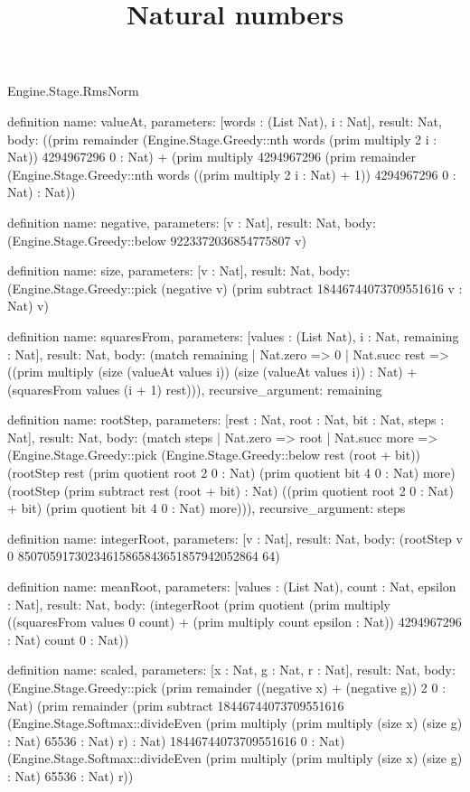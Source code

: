 \begin{lexlean}{Engine.Stage.RmsNorm}
\title{Natural numbers}
\begin{semanticmodule}
definition{
  name: valueAt,
  parameters: [words : (List Nat), i : Nat],
  result: Nat,
  body: ((prim remainder (Engine.Stage.Greedy::nth words (prim multiply 2 i : Nat)) 4294967296 0 : Nat) + (prim multiply 4294967296 (prim remainder (Engine.Stage.Greedy::nth words ((prim multiply 2 i : Nat) + 1)) 4294967296 0 : Nat) : Nat))
}

definition{
  name: negative,
  parameters: [v : Nat],
  result: Nat,
  body: (Engine.Stage.Greedy::below 9223372036854775807 v)
}

definition{
  name: size,
  parameters: [v : Nat],
  result: Nat,
  body: (Engine.Stage.Greedy::pick (negative v) (prim subtract 18446744073709551616 v : Nat) v)
}

definition{
  name: squaresFrom,
  parameters: [values : (List Nat), i : Nat, remaining : Nat],
  result: Nat,
  body: (match remaining
    | Nat.zero => 0
    | Nat.succ rest => ((prim multiply (size (valueAt values i)) (size (valueAt values i)) : Nat) + (squaresFrom values (i + 1) rest))),
  recursive_argument: remaining
}

definition{
  name: rootStep,
  parameters: [rest : Nat, root : Nat, bit : Nat, steps : Nat],
  result: Nat,
  body: (match steps
    | Nat.zero => root
    | Nat.succ more => (Engine.Stage.Greedy::pick (Engine.Stage.Greedy::below rest (root + bit)) (rootStep rest (prim quotient root 2 0 : Nat) (prim quotient bit 4 0 : Nat) more) (rootStep (prim subtract rest (root + bit) : Nat) ((prim quotient root 2 0 : Nat) + bit) (prim quotient bit 4 0 : Nat) more))),
  recursive_argument: steps
}

definition{
  name: integerRoot,
  parameters: [v : Nat],
  result: Nat,
  body: (rootStep v 0 85070591730234615865843651857942052864 64)
}

definition{
  name: meanRoot,
  parameters: [values : (List Nat), count : Nat, epsilon : Nat],
  result: Nat,
  body: (integerRoot (prim quotient (prim multiply ((squaresFrom values 0 count) + (prim multiply count epsilon : Nat)) 4294967296 : Nat) count 0 : Nat))
}

definition{
  name: scaled,
  parameters: [x : Nat, g : Nat, r : Nat],
  result: Nat,
  body: (Engine.Stage.Greedy::pick (prim remainder ((negative x) + (negative g)) 2 0 : Nat) (prim remainder (prim subtract 18446744073709551616 (Engine.Stage.Softmax::divideEven (prim multiply (prim multiply (size x) (size g) : Nat) 65536 : Nat) r) : Nat) 18446744073709551616 0 : Nat) (Engine.Stage.Softmax::divideEven (prim multiply (prim multiply (size x) (size g) : Nat) 65536 : Nat) r))
}


\end{semanticmodule}
\end{lexlean}
